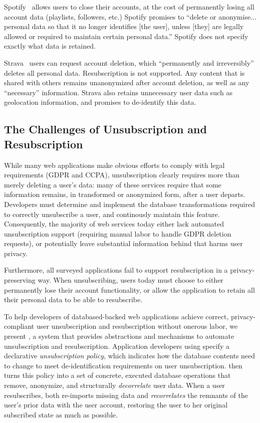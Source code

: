 Spotify~\cite{spotify:privacy} allows users to close their accounts, at the cost of permanently
losing all account data (playlists, followers, etc.) Spotify promises to ``delete or anonymise...
personal data so that it no longer identifies [the user], unless [they] are legally allowed or
required to maintain certain personal data.'' Spotify does not specify exactly what data is
retained.

Strava~\cite{strava:privacy} users can request account deletion, which ``permanently and
irreversibly'' deletes all personal data. Resubscription is not supported. Any content that is
shared with others remains unanonymized after account deletion, as well as any ``necessary''
information. Strava also retains unnecessary user data such as geolocation information, and promises
to de-identify this data.

\subsection{The Challenges of Unsubscription and Resubscription}

While many web applications make obvious efforts to comply with legal requirements (GDPR and CCPA), 
unsubscription clearly requires more than merely deleting a user's data: many of these services
require that some information remains, in transformed or anonymized form, after a user departs.
%
Developers must determine and implement the database transformations required to
correctly unsubscribe a user, and continously maintain this feature.
%
Consequently, the majority of web services today either lack automated unsubscription support
(requiring manual labor to handle \eg GDPR deletion requests), or potentially leave substantial
information behind that harms user privacy.

Furthermore, all surveyed applications fail to support resubscription in a privacy-preserving way.
When unsubscribing, users today must choose to either permanently lose their account functionality,
or allow the application to retain all their personal data to be able to resubscribe.

To help developers of databased-backed web applications achieve correct,
privacy-compliant user unsubscription and resubscription without onerous labor, we present 
\sys, a system that provides abstractions and mechanisms to automate unsubscription and
resubscription.
%
Application developers using \sys specify a declarative \emph{unsubscription policy},
which indicates how the database contents need to change to meet de-identification
requirements on user unsubscription.
%
\sys then turns this policy into a set of concrete, executed database operations that remove,
anonymize, and structurally \emph{decorrelate} user data.
%
When a user resubscribes, \sys both re-imports missing data and
\emph{recorrelates} the remnants of the user's prior data with the user account,
restoring the user to her original subscribed state as much as possible.

